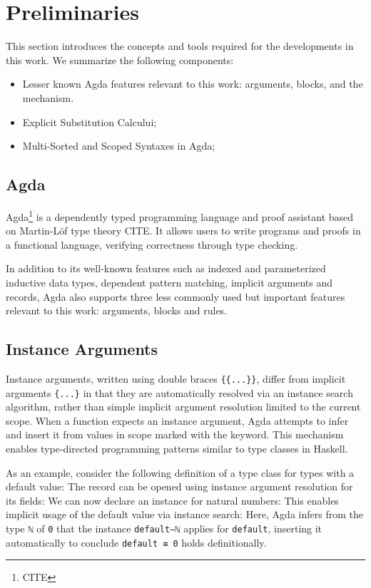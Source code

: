 \documentclass[screen,nonacm]{acmart}
\begin{document}
\section{Preliminaries}\label{sec:pre}
This section introduces the concepts and tools required for the developments in
this work. We summarize the following components:
\begin{itemize}
      \item Lesser known Agda features relevant to this work: 
            arguments,  blocks, and the 
            mechanism.
      \item Explicit Substitution Calcului;
      \item Multi-Sorted and Scoped Syntaxes in Agda;
\end{itemize}

\subsection{Agda}\label{sec:pre-agd} Agda\footnote{CITE} is a dependently typed programming language and proof
assistant based on Martin-Löf type theory CITE. It allows users to write
programs and proofs in a functional language, verifying correctness through
type checking.

In addition to its well-known features such as indexed and parameterized
inductive data types, dependent pattern matching, implicit arguments and
records, Agda also supports three less commonly used but important features
relevant to this work:  arguments, 
blocks and  rules.

\subsection*{Instance Arguments}

Instance arguments, written using double braces \verb|{{...}}|, differ from
implicit arguments \verb|{...}| in that they are automatically resolved via an
instance search algorithm, rather than simple implicit argument resolution
limited to the current scope. When a function expects an instance argument,
Agda attempts to infer and insert it from values in scope marked with the
 keyword. This mechanism enables type-directed
programming patterns similar to type classes in Haskell.

As an example, consider the following definition of a type class for types with
a default value: \EDefault{} The record can be opened using instance argument
resolution for its fields: \EDefFields{} We can now declare an instance for
natural numbers: \EDefInst{} This enables implicit usage of the default value
via instance search: \EDefEx{} Here, Agda infers from the type \verb|ℕ| of
\verb|0| that the instance \verb|default–ℕ| applies for \verb|default|,
inserting it automatically to conclude \verb|default ≡ 0| holds definitionally.
\end{document}
